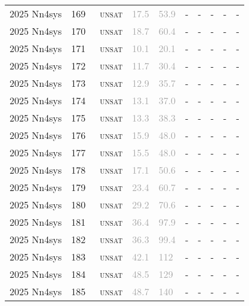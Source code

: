 \begin{center}
{\begin{longtable}{@{}llllllllll@{}}
2025 Nn4sys & 169 & ~\textsc{unsat} & \textcolor{darkgray}{17.5} & \textcolor{darkgray}{53.9} & - & - & - & - & - \\
2025 Nn4sys & 170 & ~\textsc{unsat} & \textcolor{darkgray}{18.7} & \textcolor{darkgray}{60.4} & - & - & - & - & - \\
2025 Nn4sys & 171 & ~\textsc{unsat} & \textcolor{darkgray}{10.1} & \textcolor{darkgray}{20.1} & - & - & - & - & - \\
2025 Nn4sys & 172 & ~\textsc{unsat} & \textcolor{darkgray}{11.7} & \textcolor{darkgray}{30.4} & - & - & - & - & - \\
2025 Nn4sys & 173 & ~\textsc{unsat} & \textcolor{darkgray}{12.9} & \textcolor{darkgray}{35.7} & - & - & - & - & - \\
2025 Nn4sys & 174 & ~\textsc{unsat} & \textcolor{darkgray}{13.1} & \textcolor{darkgray}{37.0} & - & - & - & - & - \\
2025 Nn4sys & 175 & ~\textsc{unsat} & \textcolor{darkgray}{13.3} & \textcolor{darkgray}{38.3} & - & - & - & - & - \\
2025 Nn4sys & 176 & ~\textsc{unsat} & \textcolor{darkgray}{15.9} & \textcolor{darkgray}{48.0} & - & - & - & - & - \\
2025 Nn4sys & 177 & ~\textsc{unsat} & \textcolor{darkgray}{15.5} & \textcolor{darkgray}{48.0} & - & - & - & - & - \\
2025 Nn4sys & 178 & ~\textsc{unsat} & \textcolor{darkgray}{17.1} & \textcolor{darkgray}{50.6} & - & - & - & - & - \\
2025 Nn4sys & 179 & ~\textsc{unsat} & \textcolor{darkgray}{23.4} & \textcolor{darkgray}{60.7} & - & - & - & - & - \\
2025 Nn4sys & 180 & ~\textsc{unsat} & \textcolor{darkgray}{29.2} & \textcolor{darkgray}{70.6} & - & - & - & - & - \\
2025 Nn4sys & 181 & ~\textsc{unsat} & \textcolor{darkgray}{36.4} & \textcolor{darkgray}{97.9} & - & - & - & - & - \\
2025 Nn4sys & 182 & ~\textsc{unsat} & \textcolor{darkgray}{36.3} & \textcolor{darkgray}{99.4} & - & - & - & - & - \\
2025 Nn4sys & 183 & ~\textsc{unsat} & \textcolor{darkgray}{42.1} & \textcolor{darkgray}{112} & - & - & - & - & - \\
2025 Nn4sys & 184 & ~\textsc{unsat} & \textcolor{darkgray}{48.5} & \textcolor{darkgray}{129} & - & - & - & - & - \\
2025 Nn4sys & 185 & ~\textsc{unsat} & \textcolor{darkgray}{48.7} & \textcolor{darkgray}{140} & - & - & - & - & - \\

\end{longtable}}
\end{center}
